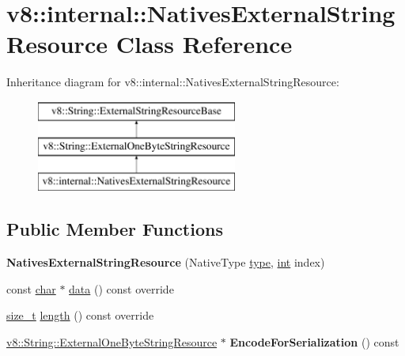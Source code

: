 \hypertarget{classv8_1_1internal_1_1NativesExternalStringResource}{}\section{v8\+:\+:internal\+:\+:Natives\+External\+String\+Resource Class Reference}
\label{classv8_1_1internal_1_1NativesExternalStringResource}
Inheritance diagram for v8\+:\+:internal\+:\+:Natives\+External\+String\+Resource\+:\begin{figure}[H]
\begin{center}
\leavevmode
\includegraphics[height=3.000000cm]{classv8_1_1internal_1_1NativesExternalStringResource}
\end{center}
\end{figure}
\subsection*{Public Member Functions}
\begin{DoxyCompactItemize}
\item 
\mbox{\label{classv8_1_1internal_1_1NativesExternalStringResource_a5605996f005d88e86f047cbac47c4093}} 
{\bfseries Natives\+External\+String\+Resource} (Native\+Type \mbox{\hyperlink{classstd_1_1conditional_1_1type}{type}}, \mbox{\hyperlink{classint}{int}} index)
\item 
const \mbox{\hyperlink{classchar}{char}} $\ast$ \mbox{\hyperlink{classv8_1_1internal_1_1NativesExternalStringResource_a80047e38c07b82d4632e7f0e35ff24b0}{data}} () const override
\item 
\mbox{\hyperlink{classsize__t}{size\+\_\+t}} \mbox{\hyperlink{classv8_1_1internal_1_1NativesExternalStringResource_aea52fbf749b2a249d23ce74caa8db7f1}{length}} () const override
\item 
\mbox{\label{classv8_1_1internal_1_1NativesExternalStringResource_a93be9f3743f942c888dbcec1f3dd239d}} 
\mbox{\hyperlink{classv8_1_1String_1_1ExternalOneByteStringResource}{v8\+::\+String\+::\+External\+One\+Byte\+String\+Resource}} $\ast$ {\bfseries Encode\+For\+Serialization} () const
\end{DoxyCompactItemize}
